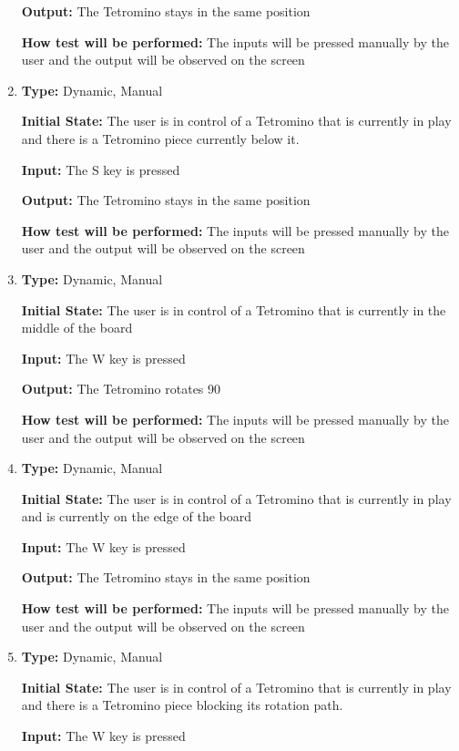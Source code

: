 \documentclass[12pt, titlepage]{article}
\begin{document}
\begin{enumerate}[{FR-CI-}1. ]
		\textbf{Output:} The Tetromino stays in the same position
		
		\textbf{How test will be performed:} The inputs will be pressed manually by the user and the output will be observed on the screen
		
		\item
		\textbf{Type:} Dynamic, Manual
		
		\textbf{Initial State:} The user is in control of a Tetromino that is currently in play and there is a Tetromino piece currently below it.
		
		\textbf{Input:} The S key is pressed 
		
		\textbf{Output:} The Tetromino stays in the same position
		
		\textbf{How test will be performed:} The inputs will be pressed manually by the user and the output will be observed on the screen
		
		\item
		\textbf{Type:} Dynamic, Manual
		
		\textbf{Initial State:} The user is in control of a Tetromino that is currently in the middle of the board
		
		\textbf{Input:} The W key is pressed 
		
		\textbf{Output:} The Tetromino rotates 90\degree
		
		\textbf{How test will be performed:} The inputs will be pressed manually by the user and the output will be observed on the screen
		
		\item
		\textbf{Type:} Dynamic, Manual
		
		\textbf{Initial State:} The user is in control of a Tetromino that is currently in play and is currently on the edge of the board
		
		\textbf{Input:} The W key is pressed 
		
		\textbf{Output:} The Tetromino stays in the same position
		
		\textbf{How test will be performed:} The inputs will be pressed manually by the user and the output will be observed on the screen
		
		\item
		\textbf{Type:} Dynamic, Manual
		
		\textbf{Initial State:} The user is in control of a Tetromino that is currently in play and there is a Tetromino piece blocking its rotation path.
		
		\textbf{Input:} The W key is pressed 
		

\end{enumerate}
\end{document}
